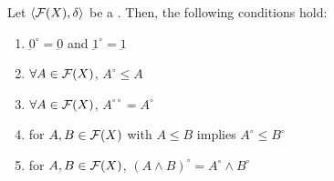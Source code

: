 \documentclass[../main-sheet.tex]{subfiles}
\begin{document}
\begin{thm}
    Let \(\langle \mathcal{F}(X), \delta \rangle \) be a \fts. Then, the following conditions hold:
    \begin{enumerate}[label=(\roman*)]
        \item \(\underbar{0}^\circ=\underbar{0}\) and \(\underbar{1}^\circ=\underbar{1}\)
        \item \(\forall A\in\mathcal{F}(X) \), \(A^\circ\leq A \)
        \item \(\forall A\in\mathcal{F}(X) \), \(A^{\circ\circ}= A^\circ \)
        \item for \(A,B\in\mathcal{F}(X) \) with \(A\leq B \) implies \(A^\circ\leq B^\circ\)
        \item for \(A,B\in\mathcal{F}(X) \), \((A\wedge B)^\circ=A^\circ\wedge B^\circ\)
    \end{enumerate}
\end{thm}
\end{document}
